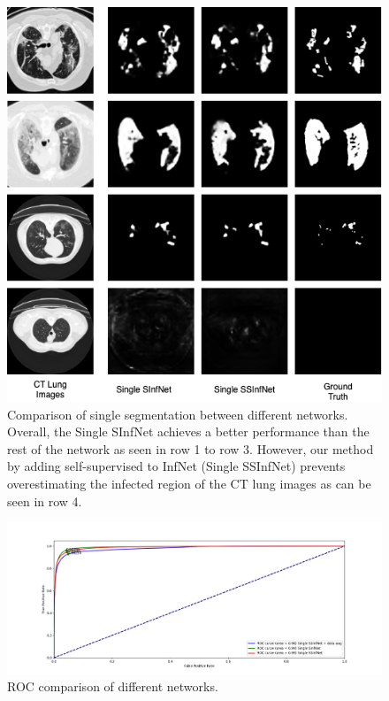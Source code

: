   \begin{figure}
 	\includegraphics[width=\linewidth]{comparison_single.png}
 	\caption{Comparison of single segmentation between different networks. Overall, the Single SInfNet achieves a better performance than the rest of the network as seen in row 1 to row 3. However, our method by adding self-supervised to InfNet (Single SSInfNet) prevents overestimating the infected region of the CT lung images as can be seen in row 4.}
 	\label{fig:single-comparison}
 \end{figure}

 \begin{figure}
 	\centering
 	\small
 	\includegraphics[width=\linewidth]{single_rocs.png}
 	\caption{ROC comparison of different networks.}
 	\label{fig:single_rocs}
 \end{figure}
 
